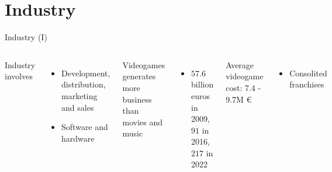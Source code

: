 \documentclass[10pt,compress]{beamer} %
\begin{document}
\section[Industry]{Industry}
\begin{frame}{Industry (I)}
    \begin{columns}
	Industry involves
	\begin{itemize}
		\item Development, distribution, marketing and sales
		\item Software and hardware
	\end{itemize}

	Videogames generates more business than movies and music
	\begin{itemize}
		\item $57.6$ billion euros in 2009, $91$ in 2016, $217$ in 2022
	\end{itemize}
	Average videogame cost: 7.4 - 9.7M \euro
	\begin{itemize}
		\item Consolited franchises
	\end{itemize}

	    \includegraphics[width=\linewidth]{figs/market}
    \end{columns}
\end{frame}
\end{document}
